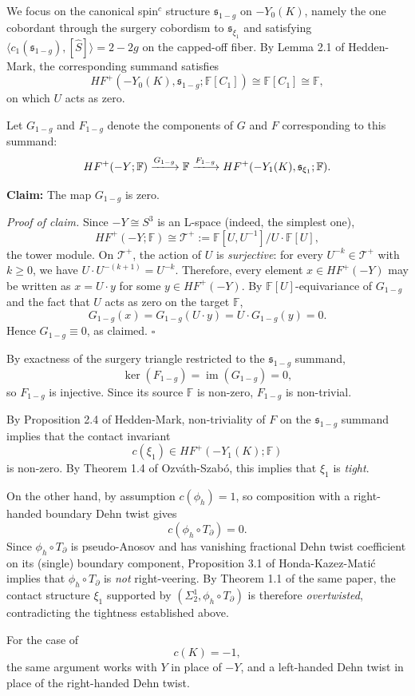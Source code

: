 \begin{myproof}
    We focus on the canonical spin$^c$ structure $\mathfrak{s}_{1-g}$ on $-Y_0(K)$, namely the one cobordant through the surgery cobordism to $\mathfrak{s}_{\xi_1}$ and satisfying $\langle c_1(\mathfrak{s}_{1-g}), [\widehat{S}]\rangle = 2-2g$ on the capped-off fiber. By Lemma 2.1 of Hedden-Mark\cite{hedden2018floer}, the corresponding summand satisfies
    \[
    HF^+(-Y_0(K), \mathfrak{s}_{1-g}; \mathbb{F}[C_1]) \cong \mathbb{F}[C_1] \cong \mathbb{F},
    \]
    on which $U$ acts as zero.

    Let $G_{1-g}$ and $F_{1-g}$ denote the components of $G$ and $F$ corresponding to this summand:
    \[
    HF^+(-Y; \mathbb{F}) \xlongrightarrow{G_{1-g}} \mathbb{F} \xlongrightarrow{F_{1-g}} HF^+(-Y_1(K), \mathfrak{s}_{\xi_1};\mathbb{F}).
    \]

    \textbf{Claim:} The map $G_{1-g}$ is zero.

    \textit{Proof of claim.} Since $-Y \cong S^3$ is an L-space (indeed, the simplest one),
    \[
    HF^+(-Y; \mathbb{F}) \cong \mathcal{T}^+ := \mathbb{F}[U, U^{-1}]\big/U \cdot \mathbb{F}[U],
    \]
    the tower module. On $\mathcal{T}^+$, the action of $U$ is \emph{surjective}: for every $U^{-k} \in \mathcal{T}^+$ with $k \geq 0$, we have $U \cdot U^{-(k+1)} = U^{-k}$. Therefore, every element $x \in HF^+(-Y)$ may be written as $x = U \cdot y$ for some $y \in HF^+(-Y)$. By $\mathbb{F}[U]$-equivariance of $G_{1-g}$ and the fact that $U$ acts as zero on the target $\mathbb{F}$,
    \[
    G_{1-g}(x) = G_{1-g}(U \cdot y) = U \cdot G_{1-g}(y) = 0.
    \]
    Hence $G_{1-g} \equiv 0$, as claimed. \hfill$\square$

    By exactness of the surgery triangle restricted to the $\mathfrak{s}_{1-g}$ summand,
    \[
    \ker(F_{1-g}) = \operatorname{im}(G_{1-g}) = 0,
    \]
    so $F_{1-g}$ is injective. Since its source $\mathbb{F}$ is non-zero, $F_{1-g}$ is non-trivial.

    By Proposition 2.4 of Hedden-Mark\cite{hedden2018floer}, non-triviality of $F$ on the $\mathfrak{s}_{1-g}$ summand implies that the contact invariant
    \[
    c(\xi_1) \in HF^+(-Y_1(K); \mathbb{F})
    \]
    is non-zero. By Theorem 1.4 of Ozv\'{a}th-Szab\'{o}\cite{ozsvath2004holomorphic}, this implies that $\xi_1$ is \emph{tight}.

    On the other hand, by assumption $c(\phi_h) = 1$, so composition with a right-handed boundary Dehn twist gives
    \[
    c(\phi_h \circ T_\partial) = 0.
    \]
    Since $\phi_h \circ T_\partial$ is pseudo-Anosov and has vanishing fractional Dehn twist coefficient on its (single) boundary component, Proposition 3.1 of Honda-Kazez-Mati\'c\cite{honda2007right} implies that $\phi_h \circ T_\partial$ is \emph{not} right-veering. By Theorem 1.1 of the same paper, the contact structure $\xi_1$ supported by $(\Sigma_2^1, \phi_h \circ T_\partial)$ is therefore \emph{overtwisted}, contradicting the tightness established above.

    For the case of
    \[
    c(K) = -1,
    \]
    the same argument works with $Y$ in place of $-Y$, and a left-handed Dehn twist in place of the right-handed Dehn twist.
\end{myproof}
